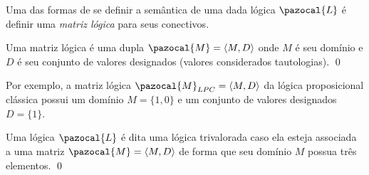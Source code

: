     Uma das formas de se definir a semântica de uma dada lógica $\pazocal{L}$ é definir uma \textit{matriz lógica} para seus conectivos. 
    \begin{definicao}
        Uma matriz lógica é uma dupla $\pazocal{M} = \langle M, D \rangle$ onde $M$ é seu domínio e $D$ é seu conjunto de valores designados (valores considerados tautologias). \qed{}
    \end{definicao}
    Por exemplo, a matriz lógica $\pazocal{M}_{LPC} = \langle M, D \rangle$ da lógica proposicional clássica possui um domínio $M = \{1, 0\}$ e um conjunto de valores designados $D = \{1\}$.
    \begin{definicao}
        Uma  lógica $\pazocal{L}$ é dita uma lógica trivalorada caso ela esteja associada a uma matriz $\pazocal{M} = \langle M, D \rangle$ de forma que seu domínio $M$ possua três elementos.
        \qed{}
    \end{definicao}


